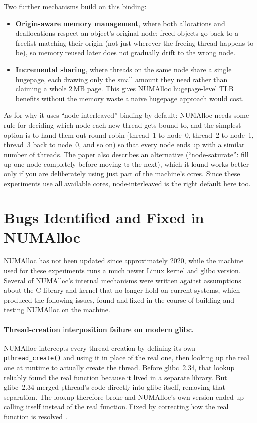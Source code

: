 \documentclass[11pt,a4paper]{article}
\begin{document}
Two further mechanisms build on this binding:
\begin{itemize}[nosep]
  \item \textbf{Origin-aware memory management}, where both allocations and deallocations respect an object's original node: freed objects go back to a freelist matching their origin (not just wherever the freeing thread happens to be), so memory reused later does not gradually drift to the wrong node.
  \item \textbf{Incremental sharing}, where threads on the same node share a single hugepage, each drawing only the small amount they need rather than claiming a whole 2\,MB page. This gives NUMAlloc hugepage-level TLB benefits without the memory waste a naive hugepage approach would cost.
\end{itemize}

As for why it uses ``node-interleaved'' binding by default: NUMAlloc needs some rule for deciding which node each new thread gets bound to, and the simplest option is to hand them out round-robin (thread~1 to node~0, thread~2 to node~1, thread~3 back to node~0, and so on) so that every node ends up with a similar number of threads. The paper also describes an alternative (``node-saturate'': fill up one node completely before moving to the next), which it found works better only if you are deliberately using just part of the machine's cores. Since these experiments use all available cores, node-interleaved is the right default here too.

\section{Bugs Identified and Fixed in NUMAlloc}

NUMAlloc has not been updated since approximately 2020, while the machine used for these experiments runs a much newer Linux kernel and glibc version. Several of NUMAlloc's internal mechanisms were written against assumptions about the C library and kernel that no longer hold on current systems, which produced the following issues, found and fixed in the course of building and testing NUMAlloc on the machine.

\paragraph{Thread-creation interposition failure on modern glibc.}
NUMAlloc intercepts every thread creation by defining its own \texttt{pthread\_create()} and using it in place of the real one, then looking up the real one at runtime to actually create the thread. Before glibc~2.34, that lookup reliably found the real function because it lived in a separate library. But glibc~2.34 merged pthread's code directly into glibc itself, removing that separation. The lookup therefore broke and NUMAlloc's own version ended up calling itself instead of the real function. Fixed by correcting how the real function is resolved~\cite{glibc234}.
\end{document}
